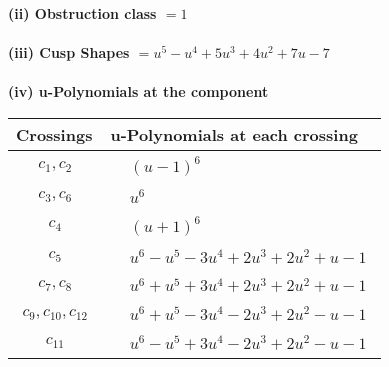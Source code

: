 \documentclass[1p]{elsarticle_modified}
\theoremstyle{definition}
\begin{document}
\flushleft \textbf{(ii) Obstruction class $= 1$}\\~\\
\flushleft \textbf{(iii) Cusp Shapes $= u^5- u^4+5 u^3+4 u^2+7 u-7$}\\~\\
\newpage\renewcommand{\arraystretch}{1}
\flushleft \textbf{(iv) u-Polynomials at the component}\newline \\
\begin{tabular}{m{50pt}|m{274pt}}
Crossings & \hspace{64pt}u-Polynomials at each crossing \\
\hline $$\begin{aligned}c_{1},c_{2}\end{aligned}$$&$\begin{aligned}
&(u-1)^6
\end{aligned}$\\
\hline $$\begin{aligned}c_{3},c_{6}\end{aligned}$$&$\begin{aligned}
&u^6
\end{aligned}$\\
\hline $$\begin{aligned}c_{4}\end{aligned}$$&$\begin{aligned}
&(u+1)^6
\end{aligned}$\\
\hline $$\begin{aligned}c_{5}\end{aligned}$$&$\begin{aligned}
&u^6- u^5-3 u^4+2 u^3+2 u^2+u-1
\end{aligned}$\\
\hline $$\begin{aligned}c_{7},c_{8}\end{aligned}$$&$\begin{aligned}
&u^6+u^5+3 u^4+2 u^3+2 u^2+u-1
\end{aligned}$\\
\hline $$\begin{aligned}c_{9},c_{10},c_{12}\end{aligned}$$&$\begin{aligned}
&u^6+u^5-3 u^4-2 u^3+2 u^2- u-1
\end{aligned}$\\
\hline $$\begin{aligned}c_{11}\end{aligned}$$&$\begin{aligned}
&u^6- u^5+3 u^4-2 u^3+2 u^2- u-1
\end{aligned}$\\
\hline
\end{tabular}\\~\\
\end{document}
